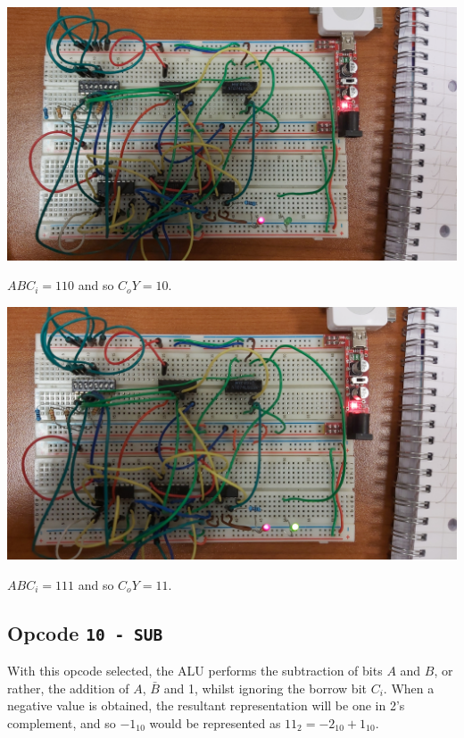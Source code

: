 \documentclass{article}
\begin{document}
\includegraphics[width=\textwidth]{./figures/11001.jpg}
\begin{center}
	$ABC_i = 110$ and so $C_o Y= 10$.
\end{center}

\vspace{2em}

\includegraphics[width=\textwidth]{./figures/11101.jpg}
\begin{center}
	$ABC_i = 111$ and so $C_o Y= 11$.
\end{center}

\subsection{Opcode \texttt{10 - SUB}}

With this opcode selected, the ALU performs the subtraction of bits $A$ and $B$, or rather, the
addition of $A$, $\bar{B}$ and 1, whilst ignoring the borrow bit $C_{i}$. When a negative value is
obtained, the resultant representation will be one in 2's complement, and so $-1_{10}$ would be
represented as $11_2 = -2_10 + 1_10$.
\end{document}
